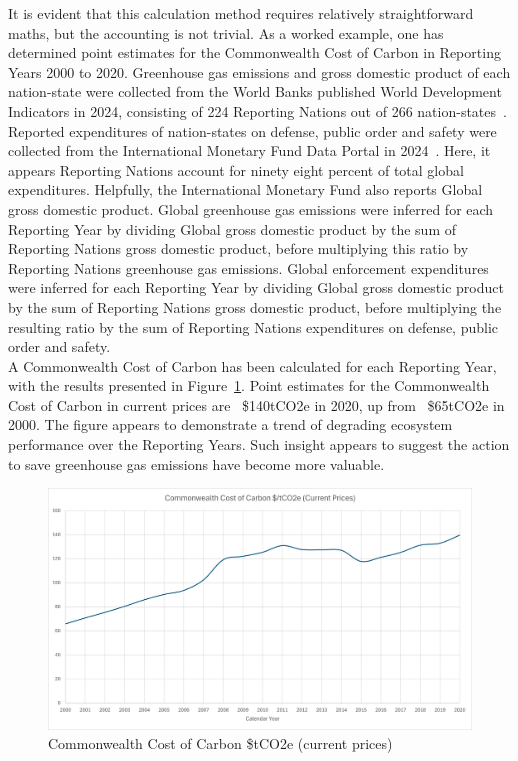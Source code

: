 \documentclass[12pt, oneside]{article}   	%
\begin{document}
It is evident that this calculation method requires relatively straightforward maths, but the accounting is not trivial.
As a worked example, one has determined point estimates for the Commonwealth Cost of Carbon in Reporting Years 2000 to 2020.
Greenhouse gas emissions and gross domestic product of each nation-state were collected from the World Banks published World Development Indicators in 2024, consisting of 224 Reporting Nations out of 266 nation-states~\cite{wbank}.
Reported expenditures of nation-states on defense, public order and safety were collected from the International Monetary Fund Data Portal in 2024~\cite{imf}.
Here, it appears Reporting Nations account for ninety eight percent of total global expenditures.
Helpfully, the International Monetary Fund also reports Global gross domestic product.
Global greenhouse gas emissions were inferred for each Reporting Year by dividing Global gross domestic product by the sum of Reporting Nations gross domestic product, before multiplying this ratio by Reporting Nations greenhouse gas emissions.
Global enforcement expenditures were inferred for each Reporting Year by dividing Global gross domestic product by the sum of Reporting Nations gross domestic product, before multiplying the resulting ratio by the sum of Reporting Nations expenditures on defense, public order and safety.\\

A Commonwealth Cost of Carbon has been calculated for each Reporting Year, with the results presented in Figure~\ref{CCC figure}.
Point estimates for the Commonwealth Cost of Carbon in current prices are ~\$140tCO2e in 2020, up from ~\$65tCO2e in 2000.
The figure appears to demonstrate a trend of degrading ecosystem performance over the Reporting Years.
Such insight appears to suggest the action to save greenhouse gas emissions have become more valuable.\\

\begin{figure}[H]
\centering
\includegraphics[width=1\textwidth]{ccc}
\caption{Commonwealth Cost of Carbon \$tCO2e (current prices)}
\label{CCC figure}
\end{figure}
\end{document}
